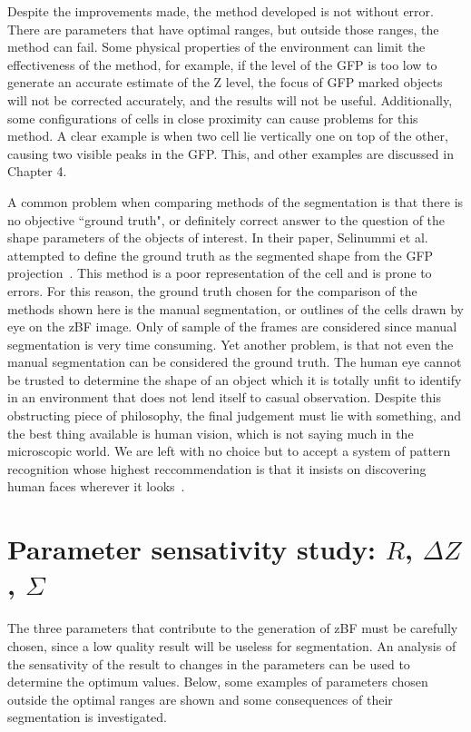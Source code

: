 Despite the improvements made, the method developed is not without error. There are parameters that have optimal ranges, but outside those ranges, the method can fail. Some physical properties of the environment can limit the effectiveness of the method, for example, if the level of the GFP is too low to generate an accurate estimate of the Z level, the focus of GFP marked objects will not be corrected accurately, and the results will not be useful. Additionally, some configurations of cells in close proximity can cause problems for this method. A clear example is when two cell lie vertically one on top of the other, causing two visible peaks in the GFP. This, and other examples are discussed in Chapter 4.

A common problem when comparing methods of the segmentation is that there is no objective ``ground truth", or definitely correct answer to the question of the shape parameters of the objects of interest. In their paper, Selinummi et al. attempted to define the ground truth as the segmented shape from the GFP projection~\cite{Selinummi:09}. This method is a poor representation of the cell and is prone to errors. For this reason, the ground truth chosen for the comparison of the methods shown here is the manual segmentation, or outlines of the cells drawn by eye on the zBF image. Only of sample of the frames are considered since manual segmentation is very time consuming. Yet another problem, is that not even the manual segmentation can be considered the ground truth. The human eye cannot be trusted to determine the shape of an object which it is totally unfit to identify in an environment that does not lend itself to casual observation. Despite this obstructing piece of philosophy, the final judgement must lie with something, and the best thing available is human vision, which is not saying much in the microscopic world. We are left with no choice but to accept a system of pattern recognition whose highest reccommendation is that it insists on discovering human faces wherever it looks~\cite{Fyfe:08}.

\section{Parameter sensativity study: $R$, $\Delta Z$, $\Sigma$}

The three parameters that contribute to the generation of zBF must be carefully chosen, since a low quality result will be useless for segmentation. An analysis of the sensativity of the result to changes in the parameters can be used to determine the optimum values. Below, some examples of parameters chosen outside the optimal ranges are shown and some consequences of their segmentation is investigated.

